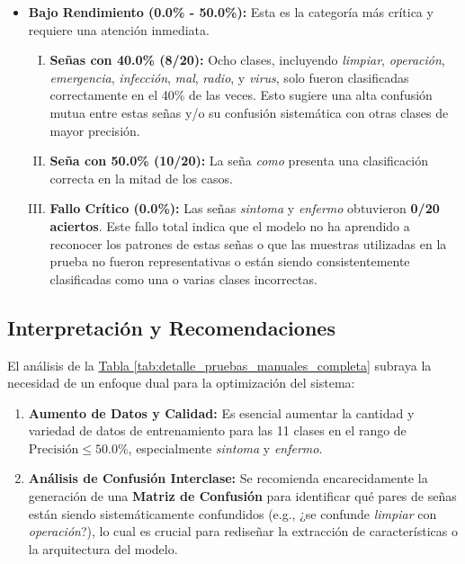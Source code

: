 \begin{itemize}
    \item \textbf{Bajo Rendimiento (0.0\% - 50.0\%):}
    Esta es la categoría más crítica y requiere una atención inmediata.
    \begin{enumerate}[I.]
        \item \textbf{Señas con 40.0\% (8/20):} Ocho clases, incluyendo \textit{limpiar}, \textit{operación}, \textit{emergencia}, \textit{infección}, \textit{mal}, \textit{radio}, y \textit{virus}, solo fueron clasificadas correctamente en el 40\% de las veces. Esto sugiere una alta confusión mutua entre estas señas y/o su confusión sistemática con otras clases de mayor precisión.
        \item \textbf{Seña con 50.0\% (10/20):} La seña \textit{como} presenta una clasificación correcta en la mitad de los casos.
        \item \textbf{Fallo Crítico (0.0\%):} Las señas \textit{sintoma} y \textit{enfermo} obtuvieron \textbf{0/20 aciertos}. Este fallo total indica que el modelo no ha aprendido a reconocer los patrones de estas señas o que las muestras utilizadas en la prueba no fueron representativas o están siendo consistentemente clasificadas como una o varias clases incorrectas.
    \end{enumerate}
\end{itemize}

\subsection{Interpretación y Recomendaciones}

El análisis de la \hyperref[tab:detalle_pruebas_manuales_completa]{Tabla \ref{tab:detalle_pruebas_manuales_completa}} subraya la necesidad de un enfoque dual para la optimización del sistema:

\begin{enumerate}
    \item \textbf{Aumento de Datos y Calidad:} Es esencial aumentar la cantidad y variedad de datos de entrenamiento para las 11 clases en el rango de $\text{Precisión} \leq 50.0\%$, especialmente \textit{sintoma} y \textit{enfermo}.
    \item \textbf{Análisis de Confusión Interclase:} Se recomienda encarecidamente la generación de una \textbf{Matriz de Confusión} para identificar qué pares de señas están siendo sistemáticamente confundidos (e.g., ¿se confunde \textit{limpiar} con \textit{operación}?), lo cual es crucial para rediseñar la extracción de características o la arquitectura del modelo.
\end{enumerate}

